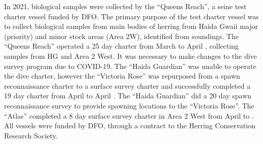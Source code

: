 In 2021, biological samples were collected by the ``Queens Reach'',
a seine test charter vessel funded by DFO.
The primary purpose of the test charter vessel was to collect biological samples
from main bodies of herring from Haida Gwaii major (priority) and minor stock areas (Area 2W),
identified from soundings.
The ``Queens Reach'' operated a 25 day charter from March  to April ,
collecting samples from HG and Area 2 West.
It was necessary to make changes to the dive survey program due to COVID-19.
The ``Haida Guardian'' was unable to operate the dive charter,
however the ``Victoria Rose'' was repurposed from a spawn reconnaissance charter
to a surface survey charter and successfully completed a 19 day charter from April  to April .
The ``Haida Guardian'' did a 20 day spawn reconnaissance survey to
provide spawning locations to the ``Victoria Rose''.
The ``Atlas'' completed a 8 day surface survey charter in Area 2 West from April  to .
All vessels were funded by DFO, through a contract to the Herring Conservation Research Society.
